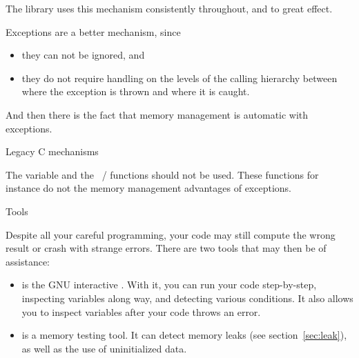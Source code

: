 The  library uses this mechanism
consistently throughout, and to great effect.

Exceptions are a better mechanism, since
\begin{itemize}
\item they can not be ignored, and
\item they do not require handling on the levels of the calling
  hierarchy between where the exception is thrown and where it is caught.
\end{itemize}
And then there is the fact that memory management is automatic with
exceptions.

 {Legacy C mechanisms}

The  variable and the
~/  functions should not be
used. These functions for instance do not the memory management
advantages of exceptions.

 {Tools}

Despite all your careful programming, your code may still compute the
wrong result or crash with strange errors. There are two tools that
may then be of assistance:
\begin{itemize}
\item {} is the GNU interactive
  . With it, you can run your code step-by-step,
  inspecting variables along way, and detecting various conditions. It
  also allows you to inspect variables after your code throws an
  error.
\item {} is a memory testing tool. It can detect
  memory leaks
  (see section~\ref{sec:leak}),
  as well as the use of uninitialized data.
\end{itemize}
